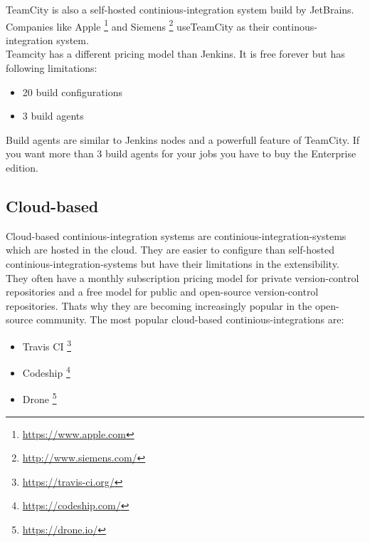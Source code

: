 TeamCity is also a self-hosted continious-integration system build by JetBrains. Companies like
Apple \footnote{\url{https://www.apple.com}} and Siemens \footnote{\url{http://www.siemens.com/}} useTeamCity as their continous-integration system.\\
Teamcity has a different pricing model than Jenkins. 
It is free forever but has following limitations:

\begin{itemize} 
        \item 20 build configurations
        \item 3 build agents
\end{itemize}

Build agents are similar to Jenkins nodes and a powerfull feature of TeamCity. If you want more than 3 build agents for your jobs you have to buy the Enterprise edition.

\subsection{Cloud-based}\label{sec:tooling-cloud-based}

Cloud-based continious-integration systems are continious-integration-systems which are hosted in the cloud.
They are easier to configure than self-hosted continious-integration-systems but have their limitations in the extensibility.
They often have a monthly subscription pricing model for private version-control repositories 
and a free model for public and open-source version-control repositories.
Thats why they are becoming increasingly popular in the open-source community.
The most popular cloud-based continious-integrations are:
\begin{itemize} 
    \item Travis CI \footnote{\url{https://travis-ci.org/}}

    \item Codeship \footnote{\url{https://codeship.com/}}

    \item Drone \footnote{\url{https://drone.io/}}

\end{itemize}

